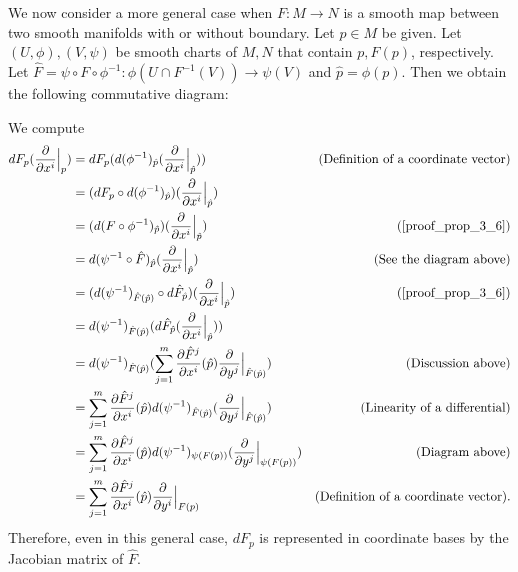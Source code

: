\begin{rem}
  We now consider a more general case when $F: M \rightarrow N$ is a smooth map between two smooth manifolds with or without boundary.
  Let $p \in M$ be given.
  Let $(U, \phi), (V, \psi)$ be smooth charts of $M, N$ that contain $p, F(p)$, respectively.
  Let $\hat{F} = \psi \circ F \circ \phi^{-1}: \phi(U \cap F^{-1}(V)) \rightarrow \psi(V)$ and $\hat{p} = \phi(p)$.
  Then we obtain the following commutative diagram:

  \begin{center}
  \end{center}

  We compute
  \begin{align*}
    dF_p(\frac{\partial}{\partial x^i}\Big\vert_p)
      &= dF_p(d(\phi^{-1})_{\hat{p}}(\frac{\partial}{\partial x^i}\Big\vert_{\hat{p}})) & \text{(Definition of a coordinate vector)} \\
      &= (dF_p \circ d(\phi^{-1})_{\hat{p}})(\frac{\partial}{\partial x^i}\Big\vert_{\hat{p}}) \\
      &= (d(F \circ \phi^{-1})_{\hat{p}})(\frac{\partial}{\partial x^i}\Big\vert_{\hat{p}}) & (\ref{proof_prop_3_6}) \\
      &= d(\psi^{-1} \circ \hat{F})_{\hat{p}}(\frac{\partial}{\partial x^i}\Big\vert_{\hat{p}}) & \text{(See the diagram above)} \\
      &= (d(\psi^{-1})_{\hat{F}(\hat{p})} \circ d\hat{F}_{\hat{p}})(\frac{\partial}{\partial x^i}\Big\vert_{\hat{p}}) & (\ref{proof_prop_3_6}) \\
      &= d(\psi^{-1})_{\hat{F}(\hat{p})}(d\hat{F}_{\hat{p}}(\frac{\partial}{\partial x^i}\Big\vert_{\hat{p}})) \\
      &= d(\psi^{-1})_{\hat{F}(\hat{p})}(\sum_{j=1}^{m} \frac{\partial \hat{F}^j}{\partial x^i}(\hat{p})\frac{\partial}{\partial y^j}\Big\vert_{\hat{F}(\hat{p})}) & (\text{Discussion above})\\
      &= \sum_{j=1}^{m} \frac{\partial \hat{F}^j}{\partial x^i}(\hat{p}) d(\psi^{-1})_{\hat{F}(\hat{p})}(\frac{\partial}{\partial y^j}\Big\vert_{\hat{F}(\hat{p})}) & (\text{Linearity of a differential})\\
      &= \sum_{j=1}^{m} \frac{\partial \hat{F}^j}{\partial x^i}(\hat{p}) d(\psi^{-1})_{\psi(F(p))}(\frac{\partial}{\partial y^j}\Big\vert_{\psi(F(p))}) & (\text{Diagram above})\\
      &= \sum_{j=1}^{m} \frac{\partial \hat{F}^j}{\partial x^i}(\hat{p}) \frac{\partial}{\partial y^i} \Big\vert_{F(p)} & (\text{Definition of a coordinate vector}).
  \end{align*}
  Therefore, even in this general case, $dF_p$ is represented in coordinate bases by the Jacobian matrix of $\hat{F}$.
\end{rem}

